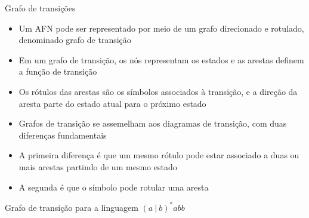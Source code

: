 \begin{frame}[fragile]{Grafo de transições}

    \begin{itemize}
        \item Um AFN pode ser representado por meio de um grafo direcionado e rotulado, denominado grafo de transição

        \item Em um grafo de transição, os nós representam os estados e as arestas definem a função de transição

        \item Os rótulos das arestas são os símbolos associados à transição, e a direção da aresta parte do estado atual para o próximo estado

        \item Grafos de transição se assemelham aos diagramas de transição, com duas diferenças fundamentais

        \item A primeira diferença é que um mesmo rótulo pode estar associado a duas ou mais arestas partindo de um mesmo estado

        \item A segunda é que o símbolo  pode rotular uma aresta
    \end{itemize}

\end{frame}

\begin{frame}[fragile]{Grafo de transição para a linguagem $(a\ |\ b)^*abb$}

    \begin{figure}
        \centering

    \end{figure}
\end{frame}

